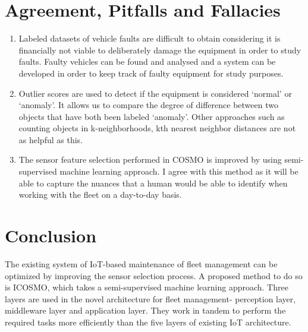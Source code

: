 \documentclass{report}
\begin{document}
 \section*{Agreement, Pitfalls and Fallacies}
    \begin{enumerate}
        \item Labeled datasets of vehicle faults are difficult to obtain considering it is financially not viable to deliberately damage the equipment in order to study faults. Faulty vehicles can be found and analysed and a system can be developed in order to keep track of faulty equipment for study purposes.
        \item Outlier scores are used to detect if the equipment is considered ‘normal’ or ‘anomaly’. It allows us to compare the degree of difference between two objects that have both been labeled ‘anomaly’. Other approaches such as counting objects in k-neighborhoods, kth nearest neighbor distances are not as helpful as this.
       			\item The sensor feature selection performed in COSMO is improved by using semi-supervised machine learning approach. I agree with this method as it will be able to capture the nuances that a human would be able to identify when working with the fleet on a day-to-day basis.
    \end{enumerate}
    \section*{Conclusion}
    The existing system of IoT-based maintenance of fleet management can be optimized by improving the sensor selection process. A proposed method to do so is ICOSMO, which takes a semi-supervised machine learning approach. Three layers are used in the novel architecture for fleet management- perception layer, middleware layer and application layer. They work in tandem to perform the required tasks more efficiently than the five layers of existing IoT architecture.
    
\end{document}
